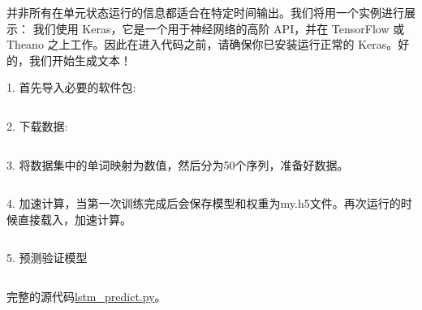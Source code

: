 \documentclass{article}
\begin{document}
并非所有在单元状态运行的信息都适合在特定时间输出。我们将用一个实例进行展示：
我们使用 Keras，它是一个用于神经网络的高阶 API，并在 TensorFlow 或 Theano 之上工作。因此在进入代码之前，请确保你已安装运行正常的 Keras。好的，我们开始生成文本！

1. 首先导入必要的软件包:
\inputminted[firstline=1,firstnumber=1,lastline=7,linenos,breaklines,breakanywhere]{python}{lstm_predict.py}
2. 下载数据:
\inputminted[firstline=8,firstnumber=8,lastline=15,linenos,breaklines,breakanywhere]{python}{lstm_predict.py}
3. 将数据集中的单词映射为数值，然后分为50个序列，准备好数据。
\inputminted[firstline=16,firstnumber=16,lastline=37,linenos,breaklines,breakanywhere]{python}{lstm_predict.py}
4. 加速计算，当第一次训练完成后会保存模型和权重为my.h5文件。再次运行的时候直接载入，加速计算。
\inputminted[firstline=38,firstnumber=38,lastline=51,linenos,breaklines,breakanywhere]{python}{lstm_predict.py}
5. 预测验证模型
\inputminted[firstline=39,firstnumber=39,lastline=65,linenos,breaklines,breakanywhere]{python}{lstm_predict.py}
完整的源代码\href{https://github.com/bleedingfight/tfnote/blob/article/lstm_txt.py}{lstm\_predict.py}。
\end{document}
